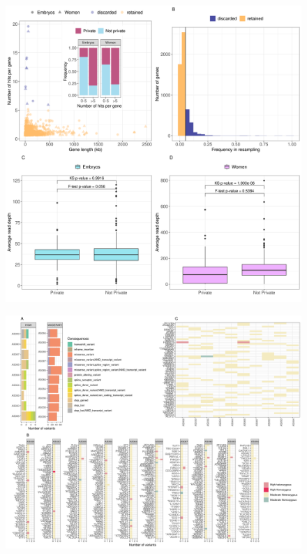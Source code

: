 \documentclass[fleqn,10pt]{wlscirep}
\begin{document}
\begin{figure}[ht]
\centering
\includegraphics[width=\linewidth]{fig/filters_EmbryoWomen.png}
\caption{\textbf{}}
\label{fig:filters}
\end{figure}

\begin{figure}[ht]
\centering
\includegraphics[width=\linewidth]{fig/panel_EmbryoResults.png}
\caption{\textbf{}}
\label{fig:resembryo}
\end{figure}
\end{document}
